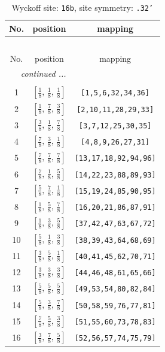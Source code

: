 \documentclass[fleqn,8pt]{jsarticle}
\begin{document}
\renewcommand{\arraystretch}{1.2}
\begin{longtable}{ccc}
\caption{Wyckoff site: {\tt 16b}, site symmetry: {\tt .32'}}
 \\
 \hline \hline
No. & position & mapping \\ \hline \endfirsthead

\multicolumn{2}{l}{\tablename\ \thetable{}} \\
 \hline \hline
No. & position & mapping \\ \hline \endhead

 \hline \hline
\multicolumn{2}{r}{\footnotesize\it continued ...} \\ \endfoot

 \hline \hline
\multicolumn{2}{r}{} \\ \endlastfoot

1 & $\left[ \frac{1}{8},\, \frac{1}{8},\, \frac{1}{8} \right]$ & {\tt [1,5,6,32,34,36]} \\ \hline
2 & $\left[ \frac{1}{8},\, \frac{7}{8},\, \frac{3}{8} \right]$ & {\tt [2,10,11,28,29,33]} \\ \hline
3 & $\left[ \frac{3}{8},\, \frac{1}{8},\, \frac{7}{8} \right]$ & {\tt [3,7,12,25,30,35]} \\ \hline
4 & $\left[ \frac{7}{8},\, \frac{3}{8},\, \frac{1}{8} \right]$ & {\tt [4,8,9,26,27,31]} \\ \hline
5 & $\left[ \frac{7}{8},\, \frac{7}{8},\, \frac{7}{8} \right]$ & {\tt [13,17,18,92,94,96]} \\ \hline
6 & $\left[ \frac{7}{8},\, \frac{1}{8},\, \frac{5}{8} \right]$ & {\tt [14,22,23,88,89,93]} \\ \hline
7 & $\left[ \frac{5}{8},\, \frac{7}{8},\, \frac{1}{8} \right]$ & {\tt [15,19,24,85,90,95]} \\ \hline
8 & $\left[ \frac{1}{8},\, \frac{5}{8},\, \frac{7}{8} \right]$ & {\tt [16,20,21,86,87,91]} \\ \hline
9 & $\left[ \frac{1}{8},\, \frac{3}{8},\, \frac{5}{8} \right]$ & {\tt [37,42,47,63,67,72]} \\ \hline
10 & $\left[ \frac{5}{8},\, \frac{1}{8},\, \frac{3}{8} \right]$ & {\tt [38,39,43,64,68,69]} \\ \hline
11 & $\left[ \frac{3}{8},\, \frac{5}{8},\, \frac{1}{8} \right]$ & {\tt [40,41,45,62,70,71]} \\ \hline
12 & $\left[ \frac{3}{8},\, \frac{3}{8},\, \frac{3}{8} \right]$ & {\tt [44,46,48,61,65,66]} \\ \hline
13 & $\left[ \frac{5}{8},\, \frac{5}{8},\, \frac{5}{8} \right]$ & {\tt [49,53,54,80,82,84]} \\ \hline
14 & $\left[ \frac{5}{8},\, \frac{3}{8},\, \frac{7}{8} \right]$ & {\tt [50,58,59,76,77,81]} \\ \hline
15 & $\left[ \frac{7}{8},\, \frac{5}{8},\, \frac{3}{8} \right]$ & {\tt [51,55,60,73,78,83]} \\ \hline
16 & $\left[ \frac{3}{8},\, \frac{7}{8},\, \frac{5}{8} \right]$ & {\tt [52,56,57,74,75,79]} \\
\end{longtable}
\end{document}
